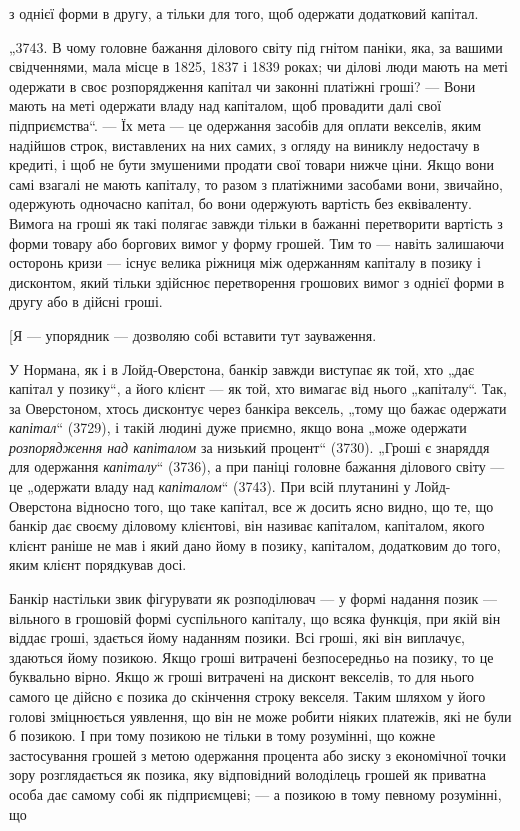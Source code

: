 \parcont{}  %
з однієї форми в другу, а тільки для того, щоб одержати
додатковий капітал.

„3743. В чому головне бажання ділового світу під гнітом паніки, яка, за вашими свідченнями, мала
місце в 1825,
1837 і 1839 роках; чи ділові люди мають на меті одержати в
своє розпорядження капітал чи законні платіжні гроші? — Вони
мають на меті одержати владу над капіталом, щоб провадити
далі свої підприємства“. — Їх мета — це одержання засобів для
оплати векселів, яким надійшов строк, виставлених на них самих,
з огляду на виниклу недостачу в кредиті, і щоб не бути змушеними продати свої товари нижче ціни.
Якщо вони самі взагалі
не мають капіталу, то разом з платіжними засобами вони, звичайно, одержують одночасно капітал, бо
вони одержують вартість
без еквіваленту. Вимога на гроші як такі полягає завжди тільки в
бажанні перетворити вартість з форми товару або боргових вимог
у форму грошей. Тим то — навіть залишаючи осторонь кризи —
існує велика ріжниця між одержанням капіталу в позику і дисконтом, який тільки здійснює перетворення
грошових вимог
з однієї форми в другу або в дійсні гроші.

[Я — упорядник — дозволяю собі вставити тут зауваження.

У Нормана, як і в Лойд-Оверстона, банкір завжди виступає
як той, хто „дає капітал у позику“, а його клієнт — як той,
хто вимагає від нього „капіталу“. Так, за Оверстоном, хтось
дисконтує через банкіра вексель, „тому що бажає одержати
\emph{капітал}“ (3729), і такій людині дуже приємно, якщо вона „може
одержати \emph{розпорядження над капіталом} за низький процент“
(3730). „Гроші є знаряддя для одержання \emph{капіталу}“ (3736), а
при паніці головне бажання ділового світу — це „одержати владу
над \emph{капіталом}“ (3743). При всій плутанині у Лойд-Оверстона відносно того, що таке капітал, все ж
досить ясно видно, що те,
що банкір дає своєму діловому клієнтові, він називає капіталом,
капіталом, якого клієнт раніше не мав і який дано йому
в позику, капіталом, додатковим до того, яким клієнт порядкував досі.

Банкір настільки звик фігурувати як розподілювач — у формі
надання позик — вільного в грошовій формі суспільного капіталу,
що всяка функція, при якій він віддає гроші, здається йому
наданням позики. Всі гроші, які він виплачує, здаються йому
позикою. Якщо гроші витрачені безпосередньо на позику, то
це буквально вірно. Якщо ж гроші витрачені на дисконт векселів, то для нього самого це дійсно є
позика до скінчення строку
векселя. Таким шляхом у його голові зміцнюється уявлення, що
він не може робити ніяких платежів, які не були б позикою.
І при тому позикою не тільки в тому розумінні, що кожне
застосування грошей з метою одержання процента або зиску
з економічної точки зору розглядається як позика, яку відповідний володілець грошей як приватна
особа дає самому собі
як підприємцеві; — а позикою в тому певному розумінні, що
\parbreak{}  %
